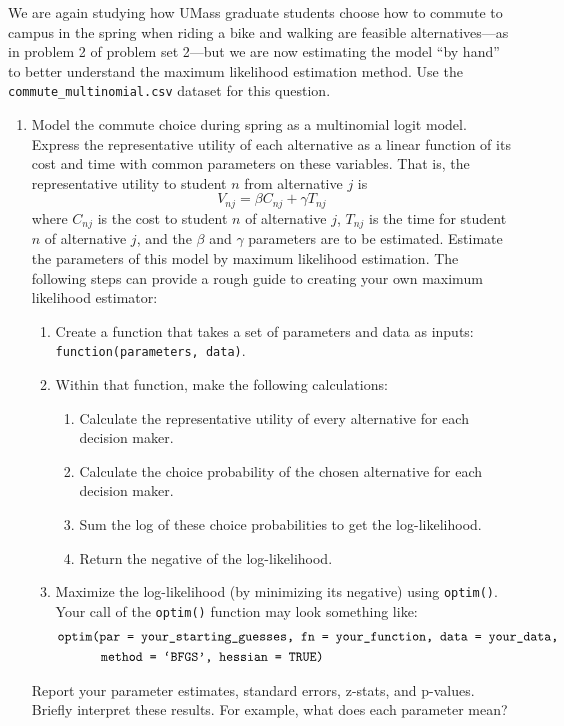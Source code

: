 \documentclass[11pt,letterpaper]{article}
\begin{document}
We are again studying how UMass graduate students choose how to commute to campus in the spring when riding a bike and walking are feasible alternatives---as in problem 2 of problem set 2---but we are now estimating the model ``by hand'' to better understand the maximum likelihood estimation method. Use the \texttt{commute\_multinomial.csv} dataset for this question.

\begin{enumerate}[label=\alph*., leftmargin=*]
	\item Model the commute choice during spring as a multinomial logit model. Express the representative utility of each alternative as a linear function of its cost and time with common parameters on these variables. That is, the representative utility to student $n$ from alternative $j$ is
	$$V_{nj} = \beta C_{nj} + \gamma T_{nj}$$
	where $C_{nj}$ is the cost to student $n$ of alternative $j$, $T_{nj}$ is the time for student $n$ of alternative $j$, and the $\beta$ and $\gamma$ parameters are to be estimated. Estimate the parameters of this model by maximum likelihood estimation. The following steps can provide a rough guide to creating your own maximum likelihood estimator:
	\begin{enumerate}[label=\Roman*.]
		\item Create a function that takes a set of parameters and data as inputs: \texttt{function(parameters, data)}.
		\item Within that function, make the following calculations:
		\begin{enumerate}[label=\roman*.]
			\item Calculate the representative utility of every alternative for each decision maker.
			\item Calculate the choice probability of the chosen alternative for each decision maker.
			\item Sum the log of these choice probabilities to get the log-likelihood.
			\item Return the negative of the log-likelihood.
		\end{enumerate}
		\item Maximize the log-likelihood (by minimizing its negative) using \texttt{optim()}. Your call of the \texttt{optim()} function may look something like:
		\begin{align*}
			&\text{\texttt{optim(par = your\_starting\_guesses, fn = your\_function, data = your\_data,}} \\
			& \qquad \quad \; \text{\texttt{method = `BFGS', hessian = TRUE)}}
		\end{align*}
	\end{enumerate}
	Report your parameter estimates, standard errors, z-stats, and p-values. Briefly interpret these results. For example, what does each parameter mean?


\end{enumerate}
\end{document}
